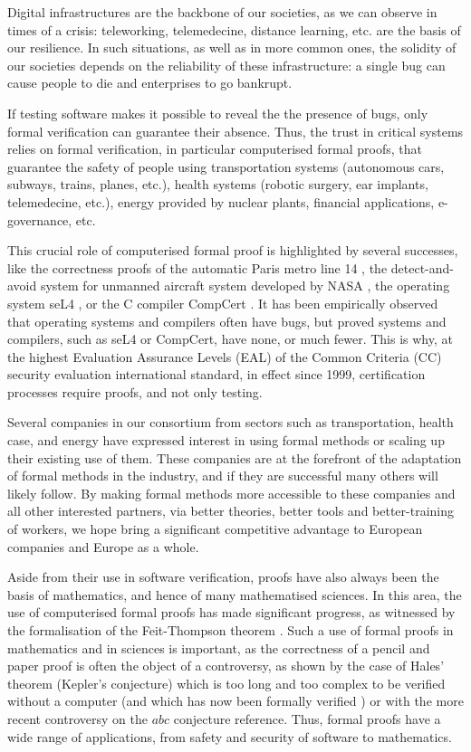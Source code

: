 \thispagestyle{empty}


Digital infrastructures are the backbone of our societies, as we can
observe in times of a crisis: teleworking, telemedecine, distance
learning, etc. are the basis of our resilience.
In such situations, as well as in more common ones, the solidity of
our societies depends on the reliability of these infrastructure: a
single bug can cause people to die and enterprises to go bankrupt.

If testing software makes it possible to reveal the the presence of
bugs, only formal verification can guarantee their absence.  Thus, the
trust in critical systems relies on formal verification, in particular
computerised formal proofs, that guarantee the safety of people using
transportation systems (autonomous cars, subways, trains, planes,
etc.), health systems (robotic surgery, ear implants, telemedecine,
etc.), energy provided by nuclear plants, financial applications,
e-governance, etc.

This crucial role of computerised formal proof is highlighted by
several successes, like the correctness proofs of the automatic Paris
metro line 14 \cite{Behm98,Lecomte17}, the detect-and-avoid system for
unmanned aircraft system developed by NASA \cite{Munoz16}, the
operating system seL4 \cite{Klein09}, or the C compiler CompCert
\cite{Leroy06}.  It has been empirically observed that operating
systems and compilers often have bugs, but proved systems and
compilers, such as seL4 or CompCert, have none, or much fewer.  This
is why, at the highest Evaluation Assurance Levels (EAL) of the Common
Criteria (CC) security evaluation international standard, in effect
since 1999, certification processes require proofs, and not only
testing.

Several companies in our consortium from sectors such as
transportation, health case, and energy have expressed interest in
using formal methods or scaling up their existing use of them. These
companies are at the forefront of the adaptation of formal methods in
the industry, and if they are successful many others will likely
follow. By making formal methods more accessible to these companies
and all other interested partners, via better theories, better tools
and better-training of workers, we hope bring a significant
competitive advantage to European companies and Europe as a whole.

Aside from their use in software verification, proofs have also always
been the basis of mathematics, and hence of many mathematised
sciences. In this area, the use of computerised formal proofs has made
significant progress, as witnessed by the formalisation of the
Feit-Thompson theorem \cite{Gonthier13}.  Such a use of formal proofs
in mathematics and in sciences is important, as the correctness of a
pencil and paper proof is often the object of a controversy, as shown
by the case of Hales' theorem (Kepler's conjecture) which is too long
and too complex to be verified without a computer (and which has now
been formally verified \cite{Hales17}) or with the more recent
controversy on the $abc$ conjecture {\color{red} reference}. Thus,
formal proofs have a wide range of applications, from safety and
security of software to mathematics.


